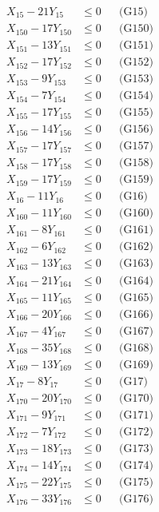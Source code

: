 \documentclass[a4paper,10pt]{article}
\begin{document}
{\begin{align}
X_{15} - 21Y_{15} &\leq 0 && \text{(G15)} \\
X_{150} - 17Y_{150} &\leq 0 && \text{(G150)} \\
X_{151} - 13Y_{151} &\leq 0 && \text{(G151)} \\
\allowbreak
X_{152} - 17Y_{152} &\leq 0 && \text{(G152)} \\
X_{153} - 9Y_{153} &\leq 0 && \text{(G153)} \\
X_{154} - 7Y_{154} &\leq 0 && \text{(G154)} \\
X_{155} - 17Y_{155} &\leq 0 && \text{(G155)} \\
X_{156} - 14Y_{156} &\leq 0 && \text{(G156)} \\
X_{157} - 17Y_{157} &\leq 0 && \text{(G157)} \\
X_{158} - 17Y_{158} &\leq 0 && \text{(G158)} \\
X_{159} - 17Y_{159} &\leq 0 && \text{(G159)} \\
X_{16} - 11Y_{16} &\leq 0 && \text{(G16)} \\
X_{160} - 11Y_{160} &\leq 0 && \text{(G160)} \\
X_{161} - 8Y_{161} &\leq 0 && \text{(G161)} \\
X_{162} - 6Y_{162} &\leq 0 && \text{(G162)} \\
X_{163} - 13Y_{163} &\leq 0 && \text{(G163)} \\
X_{164} - 21Y_{164} &\leq 0 && \text{(G164)} \\
X_{165} - 11Y_{165} &\leq 0 && \text{(G165)} \\
X_{166} - 20Y_{166} &\leq 0 && \text{(G166)} \\
X_{167} - 4Y_{167} &\leq 0 && \text{(G167)} \\
X_{168} - 35Y_{168} &\leq 0 && \text{(G168)} \\
X_{169} - 13Y_{169} &\leq 0 && \text{(G169)} \\
X_{17} - 8Y_{17} &\leq 0 && \text{(G17)} \\
\allowbreak
X_{170} - 20Y_{170} &\leq 0 && \text{(G170)} \\
X_{171} - 9Y_{171} &\leq 0 && \text{(G171)} \\
X_{172} - 7Y_{172} &\leq 0 && \text{(G172)} \\
X_{173} - 18Y_{173} &\leq 0 && \text{(G173)} \\
X_{174} - 14Y_{174} &\leq 0 && \text{(G174)} \\
X_{175} - 22Y_{175} &\leq 0 && \text{(G175)} \\
X_{176} - 33Y_{176} &\leq 0 && \text{(G176)} \\

\end{align}}
\end{document}
